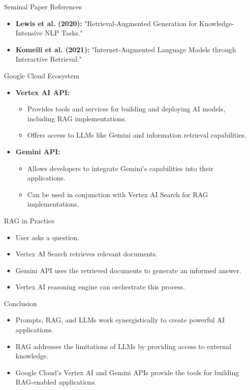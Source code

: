 \documentclass{beamer}
\begin{document}
\begin{frame}{Seminal Paper References}
  \begin{itemize}
    \item \textbf{Lewis et al. (2020):} "Retrieval-Augmented Generation for Knowledge-Intensive NLP Tasks." \cite{lewis2020retrieval}
    \item \textbf{Komeili et al. (2021):} "Internet-Augmented Language Models through Interactive Retrieval." \cite{komeili2021internet}
  \end{itemize}
\end{frame}

\begin{frame}{Google Cloud Ecosystem}
    \begin{itemize}
        \item \textbf{Vertex AI API:}
        \begin{itemize}
            \item Provides tools and services for building and deploying AI models, including RAG implementations.
            \item Offers access to LLMs like Gemini and information retrieval capabilities.
        \end{itemize}
        \item \textbf{Gemini API:}
        \begin{itemize}
            \item Allows developers to integrate Gemini's capabilities into their applications.
            \item Can be used in conjunction with Vertex AI Search for RAG implementations.
        \end{itemize}
    \end{itemize}
\end{frame}

\begin{frame}{RAG in Practice}
    \begin{itemize}
        \item User asks a question.
        \item Vertex AI Search retrieves relevant documents.
        \item Gemini API uses the retrieved documents to generate an informed answer.
        \item Vertex AI reasoning engine can orchestrate this process.
    \end{itemize}
\end{frame}

\begin{frame}{Conclusion}
  \begin{itemize}
    \item Prompts, RAG, and LLMs work synergistically to create powerful AI applications.
    \item RAG addresses the limitations of LLMs by providing access to external knowledge.
    \item Google Cloud's Vertex AI and Gemini APIs provide the tools for building RAG-enabled applications.
  \end{itemize}
\end{frame}
\end{document}
